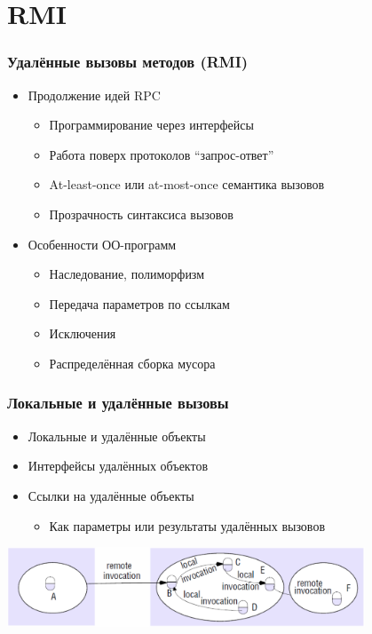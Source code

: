 \documentclass[xetex,mathserif,serif]{beamer}
\begin{document}
	\section{RMI}

	\begin{frame}
		\frametitle{Удалённые вызовы методов (RMI)}
		\begin{itemize}
			\item Продолжение идей RPC
			\begin{itemize}
				\item Программирование через интерфейсы
				\item Работа поверх протоколов ``запрос-ответ''
				\item At-least-once или at-most-once семантика вызовов
				\item Прозрачность синтаксиса вызовов
			\end{itemize}
			\item Особенности ОО-программ
			\begin{itemize}
				\item Наследование, полиморфизм
				\item Передача параметров по ссылкам
				\item Исключения
				\item Распределённая сборка мусора
			\end{itemize}
		\end{itemize}
	\end{frame}

	\begin{frame}
		\frametitle{Локальные и удалённые вызовы}
		\begin{itemize}
			\item Локальные и удалённые объекты
			\item Интерфейсы удалённых объектов
			\item Ссылки на удалённые объекты
			\begin{itemize}
				\item Как параметры или результаты удалённых вызовов
			\end{itemize}
		\end{itemize}
		\begin{center}
			\includegraphics[width=0.8\textwidth]{remoteCalls.png}
		\end{center}
	\end{frame}
\end{document}
